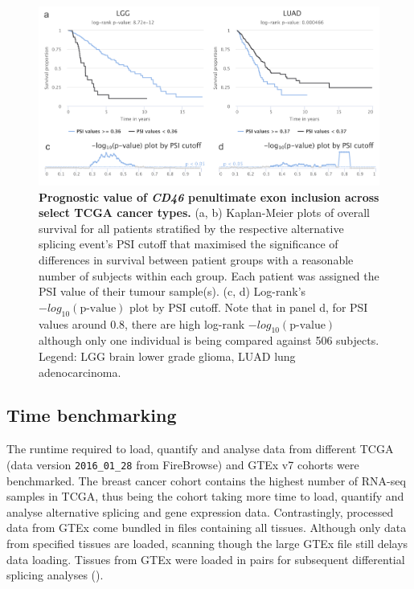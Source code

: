 \begin{figure}[!h]
  \includegraphics[width=.8\textwidth]{images/psichomics/11-cd46-as-prognosis}
  \centering
  \caption[Prognostic value of \emph{CD46} penultimate exon inclusion]{\textbf{Prognostic value of \emph{CD46} penultimate exon inclusion across select TCGA cancer types.} (a, b) Kaplan-Meier plots of overall survival for all patients stratified by the respective alternative splicing event’s PSI cutoff that maximised the significance of differences in survival between patient groups with a reasonable number of subjects within each group. Each patient was assigned the PSI value of their tumour sample(s). (c, d) Log-rank’s $-log_{10}(\textrm{p-value})$ plot by PSI cutoff. Note that in panel d, for PSI values around 0.8, there are high log-rank $-log_{10}(\textrm{p-value})$ although only one individual is being compared against 506 subjects. Legend: LGG brain lower grade glioma, LUAD lung adenocarcinoma.}
  \label{fig:psichomics-cd46-as-prognosis}
\end{figure}

\subsection{Time benchmarking}

The runtime required to load, quantify and analyse data from different TCGA (data version \texttt{2016\_01\_28} from FireBrowse) and GTEx v7 cohorts were benchmarked. The breast cancer cohort contains the highest number of RNA-seq samples in TCGA, thus being the cohort taking more time to load, quantify and analyse alternative splicing and gene expression data. Contrastingly, processed data from GTEx come bundled in files containing all tissues. Although only data from specified tissues are loaded, scanning though the large GTEx file still delays data loading. Tissues from GTEx were loaded in pairs for subsequent differential splicing analyses ().

